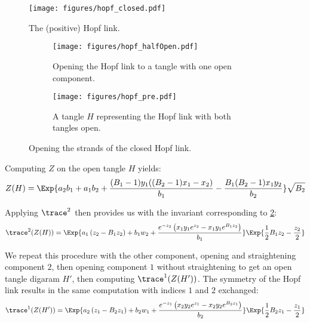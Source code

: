 \begin{figure}[ht]
        \centering
        \texttt{[image: figures/hopf\_closed.pdf]}
        \caption{The (positive) Hopf link.}
        \label{fig:hopf_closed}
\end{figure}
\begin{figure}[ht]
        \begin{subfigure}[b]{0.5\textwidth}
                \centering
                \texttt{[image: figures/hopf\_halfOpen.pdf]}
                \caption{Opening the Hopf link to a tangle with one open
                component.}
                \label{fig:hopf_halfOpen}
        \end{subfigure}
        \begin{subfigure}[b]{0.5\textwidth}
                \centering
                \texttt{[image: figures/hopf\_pre.pdf]}
                \caption{A tangle $H$ representing the Hopf link with both
                tangles open.}
                \label{fig:hopf_pre}
        \end{subfigure}
        \label{fig:hopf_decompose}
        \caption{Opening the strands of the closed Hopf link.}
\end{figure}

Computing $Z$ on the open tangle $H$ yields:
\begin{equation}
        Z(H) = \Exp{
                a_2 b_1+a_1 b_2+\frac{(B_1-1) y_1
                ((B_2-1) x_1-x_2)}{b_1}-\frac{B_1
                (B_2-1) x_1 y_2}{b_2}
        }
        \sqrt{B_2}
\end{equation}

Applying $\trace^2$ then provides us with the invariant corresponding to
\cref{fig:hopf_halfOpen}:
\begin{equation}
        \trace^{2}(Z(H)) = \Exp{
                a_1 \left(z_2-B_1 z_2\right)+b_1 w_2+\frac{e^{-z_2} \left(x_1
                y_1 e^{z_2}-x_1 y_1 e^{B_{1} z_2}\right)}{b_1}
        }
        \Exp{\frac{1}{2} B_{1} z_2-\frac{z_2}{2}}
\end{equation}

We repeat this procedure with the other component, opening and straightening
component $2$, then opening component $1$ without straightening to get an open
tangle digaram $H'$, then computing $\trace^1(Z(H'))$. The symmetry of the Hopf
link results in the same computation with indices $1$ and $2$ exchanged:
\begin{equation}
        \trace^{1}(Z(H')) = \Exp{
                a_2 \left(z_1-B_2 z_1\right)+b_2 w_1+\frac{e^{-z_1} \left(x_2
                y_2 e^{z_1}-x_2 y_2 e^{B_2 z_1}\right)}{b_2}
        }
        \Exp{\frac{1}{2} B_2 z_1-\frac{z_1}{2}}
\end{equation}


